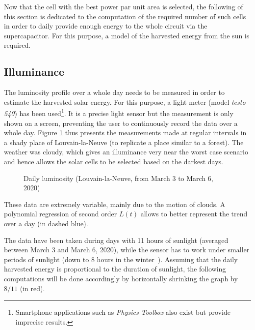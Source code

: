 \documentclass{EPL-master-thesis-covers-EN}
\newcommand{\te}[1]{\textrm{#1}}
\begin{document}
Now that the cell with the best power par unit area is selected, the following of this section is dedicated to the computation of the required number of such cells in order to daily provide enough energy to the whole circuit via the supercapacitor. For this purpose, a model of the harvested energy from the sun is required.


\subsection*{Illuminance}

The luminosity profile over a whole day needs to be measured in order to estimate the harvested solar energy. For this purpose, a light meter (model \textit{testo 540}) has been used\footnote{Smartphone applications such as \textit{Physics Toolbox} also exist but provide imprecise results.}. It is a precise light sensor but the measurement is only shown on a screen, preventing the user to continuously record the data over a whole day. Figure \ref{fig:daily_luminosity} thus presents the measurements made at regular intervals in a shady place of Louvain-la-Neuve (to replicate a place similar to a forest). The weather was cloudy, which gives an illuminance very near the worst case scenario and hence allows the solar cells to be selected based on the darkest days.

\begin{figure}[H]
    \centering
    
    \caption{Daily luminosity (Louvain-la-Neuve, from March 3 to March 6, 2020)}
    \label{fig:daily_luminosity}
\end{figure}

These data are extremely variable, mainly due to the motion of clouds. A polynomial regression of second order $L(t)$ allows to better represent the trend over a day (in dashed blue).

The data have been taken during days with 11 hours of sunlight (averaged between March 3 and March 6, 2020), while the sensor has to work under smaller periods of sunlight (down to 8 hours in the winter~\cite{sunlight}). Assuming that the daily harvested energy is proportional to the duration of sunlight, the following computations will be done accordingly by horizontally shrinking the graph by $8/11$ (in red).
\end{document}
